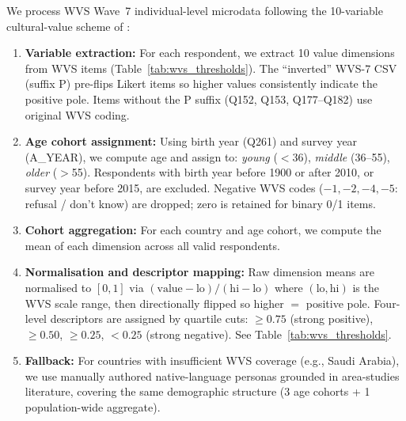 \documentclass{article}
\begin{document}
We process WVS Wave~7 individual-level microdata following the 10-variable
cultural-value scheme of \citet{greco2026personas}:
\begin{enumerate}
  \item \textbf{Variable extraction:} For each respondent, we extract 10 value
    dimensions from WVS items (Table~\ref{tab:wvs_thresholds}). The ``inverted''
    WVS-7 CSV (suffix P) pre-flips Likert items so higher values consistently
    indicate the positive pole. Items without the P suffix (Q152, Q153,
    Q177--Q182) use original WVS coding.
  \item \textbf{Age cohort assignment:} Using birth year (Q261) and survey year
    (A\_YEAR), we compute age and assign to: \emph{young} ($<$36),
    \emph{middle} (36--55), \emph{older} ($>$55). Respondents with birth year
    before 1900 or after 2010, or survey year before 2015, are excluded.
    Negative WVS codes ($-1, -2, -4, -5$: refusal / don't know) are dropped;
    zero is retained for binary 0/1 items.
  \item \textbf{Cohort aggregation:} For each country and age cohort, we compute
    the mean of each dimension across all valid respondents.
  \item \textbf{Normalisation and descriptor mapping:} Raw dimension means are
    normalised to $[0,1]$ via $(\text{value}-\text{lo})/(\text{hi}-\text{lo})$
    where $(\text{lo},\text{hi})$ is the WVS scale range, then directionally
    flipped so higher $=$ positive pole. Four-level descriptors are assigned
    by quartile cuts: $\geq 0.75$ (strong positive), $\geq 0.50$, $\geq 0.25$,
    $< 0.25$ (strong negative). See Table~\ref{tab:wvs_thresholds}.
  \item \textbf{Fallback:} For countries with insufficient WVS coverage (e.g.,
    Saudi Arabia), we use manually authored native-language personas grounded in
    area-studies literature, covering the same demographic structure (3 age
    cohorts + 1 population-wide aggregate).
\end{enumerate}
\end{document}
